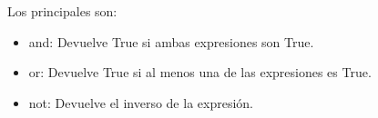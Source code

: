 Los principales son:
\begin{itemize}
    \item and: Devuelve True si ambas expresiones son True.
    \begin{figure}[h]
      \centering
    \end{figure}
    \newpage
    \item or: Devuelve True si al menos una de las expresiones es True.
    \begin{figure}[h]
      \centering
    \end{figure}
    \newpage
    \item not: Devuelve el inverso de la expresión.
    \begin{figure}[h]
      \centering
    \end{figure}
   
\end{itemize}

